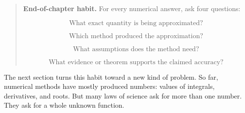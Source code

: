 \begin{quote}
\textbf{End-of-chapter habit.}
For every numerical answer, ask four questions:

\[
\text{What exact quantity is being approximated?}
\]

\[
\text{Which method produced the approximation?}
\]

\[
\text{What assumptions does the method need?}
\]

\[
\text{What evidence or theorem supports the claimed accuracy?}
\]
\end{quote}

The next section turns this habit toward a new kind of problem.  So far, numerical
methods have mostly produced numbers: values of integrals, derivatives, and roots.
But many laws of science ask for more than one number.  They ask for a whole unknown
function.


